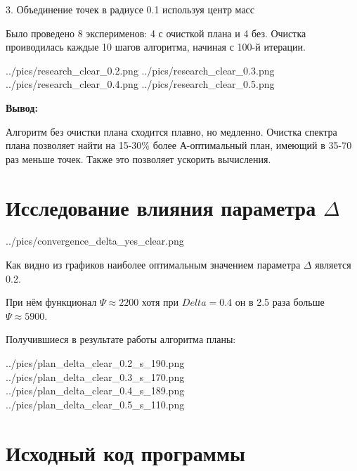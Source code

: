 3. Объединение точек в радиусе 0.1 используя центр масс

\vspace{10mm}


Было проведено 8 эксперименов: 4 с очисткой плана и 4 без.
Очистка проиводилась каждые 10 шагов алгоритма, начиная с 100-й итерации.

{../pics/research_clear_0.2.png}
{../pics/research_clear_0.3.png}
{../pics/research_clear_0.4.png}
{../pics/research_clear_0.5.png}

\textbf{Вывод:}

Алгоритм без очистки плана сходится плавно, но медленно.
Очистка спектра плана позволяет найти на 15-30\% более А-оптимальный план, 
имеющий в 35-70 раз меньше точек. Также это позволяет ускорить вычисления.


\section{Исследование влияния параметра $\Delta$}

{../pics/convergence_delta_yes_clear.png}

Как видно из графиков наиболее оптимальным значением параметра $\Delta$ является 0.2.

При нём функционал $\Psi \approx 2200$ хотя при $Delta = 0.4$ он в 2.5 раза больше $\Psi \approx 5900$.

Получившиеся в результате работы алгоритма планы:


{../pics/plan_delta_clear_0.2_s_190.png}
{../pics/plan_delta_clear_0.3_s_170.png}
{../pics/plan_delta_clear_0.4_s_189.png}
{../pics/plan_delta_clear_0.5_s_110.png}







\section{Исходный код программы}
